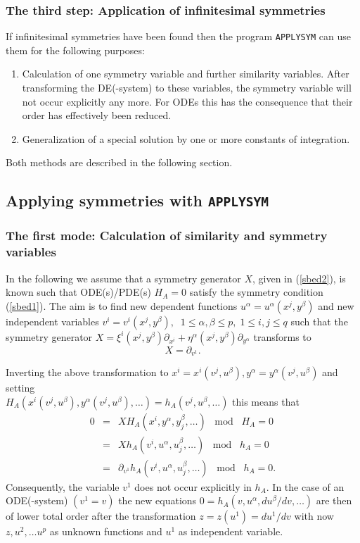 \subsubsection{The third step: Application of infinitesimal symmetries}
If infinitesimal symmetries have been found then
the program {\tt APPLYSYM} can use them for the following purposes:
\begin{enumerate}
\item Calculation of one symmetry variable and further similarity variables.
After transforming
the DE(-system) to these variables, the symmetry variable will not occur
explicitly any more. For ODEs this has the consequence that their order has
effectively been reduced.
\item Generalization of a special solution by one or more constants of
integration.
\end{enumerate}
Both methods are described in the following section.
\subsection{Applying symmetries with {\tt APPLYSYM}}
\subsubsection{The first mode: Calculation of similarity and symmetry variables}
In the following we assume that a symmetry generator $X$, given
in (\ref{sbed2}), is known such that ODE(s)/PDE(s) $H_A=0$
satisfy the symmetry condition (\ref{sbed1}). The aim is to
find new dependent functions $u^\alpha = u^\alpha(x^j,y^\beta)$ and
new independent variables $v^i = v^i(x^j,y^\beta),\;\;
1\leq\alpha,\beta\leq p,\;1\leq i,j \leq q$
such that the symmetry generator
$X = \xi^i(x^j,y^\beta)\partial_{x^i} +
     \eta^\alpha(x^j,y^\beta)\partial_{y^\alpha}$
transforms to
\begin{equation}
X = \partial_{v^1}.    \label{sbed3}
\end{equation}

Inverting the above transformation to $x^i=x^i(v^j,u^\beta),
y^\alpha=y^\alpha(v^j,u^\beta)$ and setting \\
$H_A(x^i(v^j,u^\beta), y^\alpha(v^j,u^\beta),\ldots) =
h_A(v^j, u^\beta,\ldots)$
this means that
\begin{eqnarray*}
 0 & = & X H_A(x^i,y^\alpha,y^\beta_j,\ldots)\;\;\; \mbox{mod} \;\;\; H_A=0 \\
   & = & X h_A(v^i,u^\alpha,u^\beta_j,\ldots)\;\;\; \mbox{mod} \;\;\; h_A=0 \\
   & = & \partial_{v^1}h_A(v^i,u^\alpha,u^\beta_j,\ldots)\;\;\; \mbox{mod}
         \;\;\; h_A=0.
\end{eqnarray*}
Consequently, the variable $v^1$ does not occur explicitly in $h_A$.
In the case of an ODE(-system) $(v^1=v)$
the new equations $0=h_A(v,u^\alpha,du^\beta/dv,\ldots)$
are then of lower total order
after the transformation $z = z(u^1) = du^1/dv$ with now $z, u^2,\ldots u^p$
as unknown functions and $u^1$ as independent variable.

